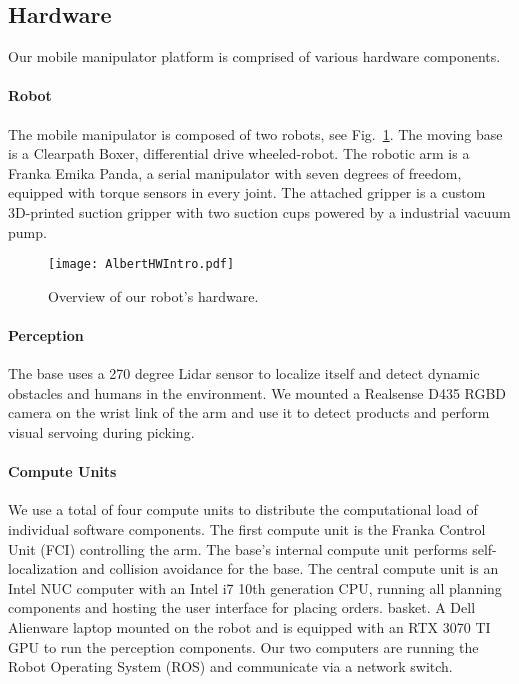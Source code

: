 \subsection{Hardware}
\label{sec:hardware}

Our mobile manipulator platform is comprised of various hardware components. 

\paragraph{Robot}
The mobile manipulator is composed of two robots, see Fig.~\ref{fig:hardware}. The moving base is a Clearpath
Boxer, differential drive wheeled-robot. The robotic arm is a Franka Emika
Panda, a serial manipulator with seven degrees of freedom, equipped with torque
sensors in every joint. %
The attached gripper is a
custom 3D-printed suction gripper with two suction cups powered by a industrial
vacuum pump.
\begin{figure}[t]
    \centering    
    \texttt{[image: AlbertHWIntro.pdf]}
    \caption{Overview of our robot's hardware.}
    \label{fig:hardware}
\end{figure}


\paragraph{Perception}
The base uses a 270 degree Lidar sensor to localize itself and detect dynamic obstacles and humans in the environment. 
We mounted a Realsense D435 RGBD camera on the wrist
link of the arm and use it to detect products and perform visual servoing during picking.

\paragraph{Compute Units}
We use a total of four compute units to distribute the computational load of individual software components. 
The first compute unit is the Franka Control Unit (FCI) controlling the arm. 
The base's internal compute unit performs
self-localization and collision avoidance for the base.
The central compute
unit is an Intel NUC computer with an Intel i7 10th generation CPU, running all planning components and hosting the user interface for placing orders. 
basket. 
A Dell Alienware laptop mounted on the robot and is equipped with an RTX 3070 TI GPU to run the perception components. %
Our two computers are running the Robot Operating System (ROS) and communicate via a network switch.
